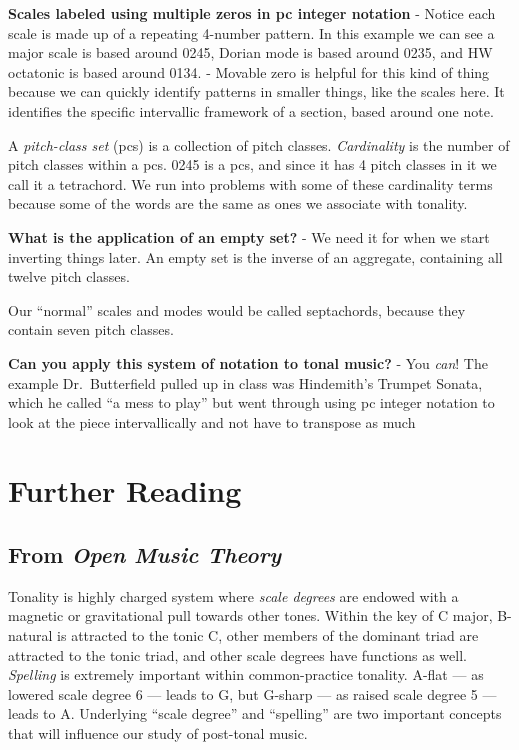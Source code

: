 \documentclass{book}
\begin{document}
\textbf{Scales labeled using multiple zeros in pc integer notation} - Notice
each scale is made up of a repeating 4-number pattern. In this example we can
see a major scale is based around 0245, Dorian mode is based around 0235, and
HW octatonic is based around 0134. - Movable zero is helpful for this kind of
thing because we can quickly identify patterns in smaller things, like the
scales here. It identifies the specific intervallic framework of a section,
based around one note.

A \emph{pitch-class set} (pcs) is a collection of pitch classes.
\emph{Cardinality} is the number of pitch classes within a pcs. 0245 is a pcs,
and since it has 4 pitch classes in it we call it a tetrachord. We run into
problems with some of these cardinality terms because some of the words are
the same as ones we associate with tonality.

\textbf{What is the application of an empty set?} - We need it for when we
start inverting things later. An empty set is the inverse of an aggregate,
containing all twelve pitch classes.

Our ``normal'' scales and modes would be called septachords, because they
contain seven pitch classes.

\textbf{Can you apply this system of notation to tonal music?} - You
\emph{can}! The example Dr.~Butterfield pulled up in class was Hindemith's
Trumpet Sonata, which he called ``a mess to play'' but went through using pc
integer notation to look at the piece intervallically and not have to
transpose as much

\hypertarget{further-reading-22}{%
\chapter{Further Reading}\label{further-reading-22}}

\hypertarget{from-open-music-theory-21}{%
\section{\texorpdfstring{From \emph{Open Music
Theory}}{From Open Music Theory}}\label{from-open-music-theory-21}}

Tonality is highly charged system where \emph{scale degrees} are endowed with
a magnetic or gravitational pull towards other tones. Within the key of C
major, B-natural is attracted to the tonic C, other members of the dominant
triad are attracted to the tonic triad, and other scale degrees have functions
as well. \emph{Spelling} is extremely important within common-practice
tonality. A-flat --- as lowered scale degree 6 --- leads to G, but G-sharp ---
as raised scale degree 5 --- leads to A. Underlying ``scale degree'' and
``spelling'' are two important concepts that will influence our study of
post-tonal music.
\end{document}
